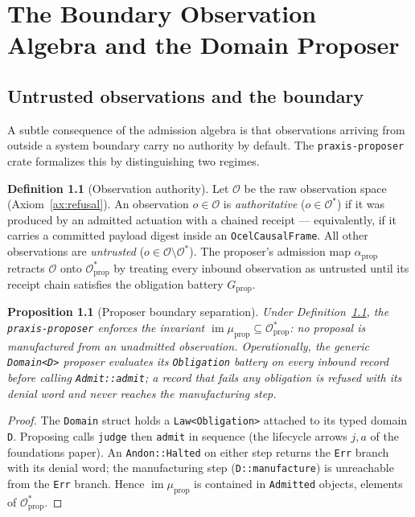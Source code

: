 \documentclass[11pt,oneside]{book}
\theoremstyle{definition}
\newtheorem{definition}{Definition}[chapter]
\theoremstyle{plain}
\newtheorem{proposition}[theorem]{Proposition}
\theoremstyle{remark}
\newcommand{\Obs}{\mathcal{O}}                 %
\newcommand{\Adm}{\mathcal{O}^{*}}             %
\newcommand{\muop}{\mu}                        %
\newcommand{\adm}{\alpha}                      %
\DeclareMathOperator{\im}{im}
\newcommand{\code}[1]{\texttt{#1}}
\begin{document}
\chapter{The Boundary Observation Algebra and the Domain Proposer}
\label{ch:proposer}

\section{Untrusted observations and the boundary}

A subtle consequence of the admission algebra is that observations arriving from outside a
system boundary carry no authority by default. The \code{praxis-proposer} crate formalizes
this by distinguishing two regimes.

\begin{definition}[Observation authority]\label{def:obsauth}
Let $\Obs$ be the raw observation space (Axiom~\ref{ax:refusal}). An observation
$o\in\Obs$ is \emph{authoritative} ($o\in\Obs^{*}$) if it was produced by an admitted
actuation with a chained receipt --- equivalently, if it carries a committed payload digest
inside an \code{OcelCausalFrame}. All other observations are \emph{untrusted}
($o\in\Obs\setminus\Obs^{*}$). The proposer's admission map $\adm_{\mathrm{prop}}$ retracts
$\Obs$ onto $\Adm_{\mathrm{prop}}$ by treating every inbound observation as untrusted until
its receipt chain satisfies the obligation battery $G_{\mathrm{prop}}$.
\end{definition}

\begin{proposition}[Proposer boundary separation]\label{prop:boundary}
Under Definition~\ref{def:obsauth}, the \code{praxis-proposer} enforces the invariant
$\im\muop_{\mathrm{prop}} \subseteq \Adm_{\mathrm{prop}}$: no proposal is manufactured from
an unadmitted observation. Operationally, the generic \code{Domain<D>} proposer evaluates
its \code{Obligation} battery on every inbound record before calling
\code{Admit::admit}; a record that fails any obligation is refused with its denial word and
never reaches the manufacturing step.
\end{proposition}

\begin{proof}
The \code{Domain} struct holds a \code{Law<Obligation>} attached to its typed domain
\code{D}. Proposing calls \code{judge} then \code{admit} in sequence (the lifecycle arrows
$j,a$ of the foundations paper). An \code{Andon::Halted} on either step returns the
\code{Err} branch with its denial word; the manufacturing step (\code{D::manufacture}) is
unreachable from the \code{Err} branch. Hence $\im\muop_{\mathrm{prop}}$ is contained in
\code{Admitted} objects, elements of $\Adm_{\mathrm{prop}}$.
\end{proof}
\end{document}
